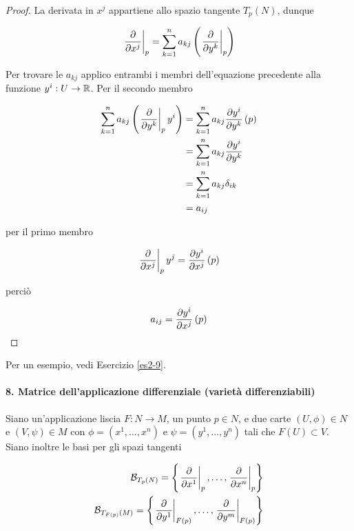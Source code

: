 \begin{proof}
	La derivata in $ x^{j} $ appartiene allo spazio tangente $ T_{p}(N) $, dunque
	
	\begin{equation}
		\eval{ \pdv{x^{j}} }_{p} = \sum_{k=1}^{n} a_{kj} \left( \eval{ \pdv{y^{k}} }_{p} \right)
	\end{equation}

	Per trovare le $ a_{kj} $ applico entrambi i membri dell'equazione precedente alla funzione $ y^{i} : U \to \mathbb{R} $. Per il secondo membro
	
	\begin{align}
		\begin{split}
			\sum_{k=1}^{n} a_{kj} \left( \eval{ \pdv{y^{k}} }_{p} y^{i} \right) &= \sum_{k=1}^{n} a_{kj} \pdv{y^{i}}{y^{k}} \, (p)\\
			&= \sum_{k=1}^{n} a_{kj} \pdv{y^{i}}{y^{k}}\\
			&= \sum_{k=1}^{n} a_{kj} \delta_{ik}\\
			&= a_{ij}
		\end{split}
	\end{align}

	per il primo membro
	
	\begin{equation}
		\eval{ \pdv{x^{j}} }_{p} y^{j} = \pdv{y^{i}}{x^{j}} \, (p)
	\end{equation}

	perciò
	
	\begin{equation}
		a_{ij} = \pdv{y^{i}}{x^{j}} \, (p)
	\end{equation}
\end{proof}

Per un esempio, vedi Esercizio \ref{es2-9}.

\paragraph{8. Matrice dell'applicazione differenziale (varietà differenziabili)}

Siano un'applicazione liscia $ F : N \to M $, un punto $ p \in N $, e due carte $ (U,\phi) \in N $ e $ (V,\psi) \in M $ con $ \phi = (x^{1},\dots,x^{n}) $ e $ \psi = (y^{1},\dots,y^{n}) $ tali che $ F(U) \subset V $. Siano inoltre le basi per gli spazi tangenti

\begin{align}
	\B_{T_{p}(N)} = \left\{ \eval{ \pdv{x^{1}} }_{p}, \dots, \eval{ \pdv{x^{n}} }_{p} \right\}\\
	\B_{T_{F(p)}(M)} = \left\{ \eval{ \pdv{y^{1}} }_{F(p)}, \dots, \eval{ \pdv{y^{m}} }_{F(p)} \right\}
\end{align}

